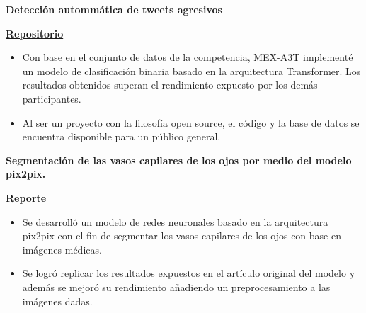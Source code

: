 \documentclass[a3paper]{adcv_color}
\newcommand{\proyect}[5]{\begin{minipage}{1\linewidth}
		\begin{minipage}{1\linewidth}
			\textbf{#1}
		\end{minipage}
	\end{minipage}
	\href{#4}{\textbf{#5}}
	\vspace{-1cm}\\
}
\begin{document}
\proyect{Detección autommática de tweets agresivos}{Agosto 2022}{-0.6}{https://github.com/giovannilopez9808/AgressiveDetectionMEXA3T}{Repositorio}
\begin{itemize}
	\setlength\itemsep{0em}
	\item Con base en el conjunto de datos de la competencia, MEX-A3T implementé un modelo de clasificación binaria basado en la arquitectura Transformer. Los resultados obtenidos superan el rendimiento expuesto por los demás participantes.
	\item  Al ser un proyecto con la filosofía open source, el código y la base de datos se encuentra disponible para un público general.
\end{itemize}
\proyect{Segmentación de las vasos capilares de los ojos por medio del modelo pix2pix.}{Agosto 2022}{-0.6}{https://raw.githubusercontent.com/giovannilopez9808/RetinaVesselNet/main/Document/Main.pdf}{Reporte}
\begin{itemize}
	\setlength\itemsep{0em}
	\item Se desarrolló un modelo de redes neuronales basado en la arquitectura pix2pix con el fin de segmentar los vasos capilares de los ojos con base en imágenes médicas.
	\item Se logró replicar los resultados expuestos en el artículo original del modelo y además se mejoró su rendimiento añadiendo un preprocesamiento a las imágenes dadas.
\end{itemize}




\end{document}
